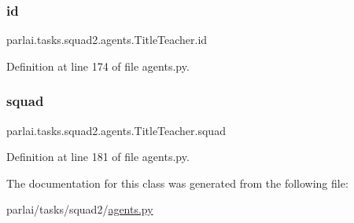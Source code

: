 \subsubsection{\texorpdfstring{id}{id}}
{\footnotesize\ttfamily parlai.\+tasks.\+squad2.\+agents.\+Title\+Teacher.\+id}



Definition at line 174 of file agents.\+py.

\mbox{\label{classparlai_1_1tasks_1_1squad2_1_1agents_1_1TitleTeacher_a192c7e24f0159dcb8c512526e7f8a1fb}} 
\subsubsection{\texorpdfstring{squad}{squad}}
{\footnotesize\ttfamily parlai.\+tasks.\+squad2.\+agents.\+Title\+Teacher.\+squad}



Definition at line 181 of file agents.\+py.



The documentation for this class was generated from the following file\+:\begin{DoxyCompactItemize}
\item 
parlai/tasks/squad2/\hyperlink{parlai_2tasks_2squad2_2agents_8py}{agents.\+py}\end{DoxyCompactItemize}
